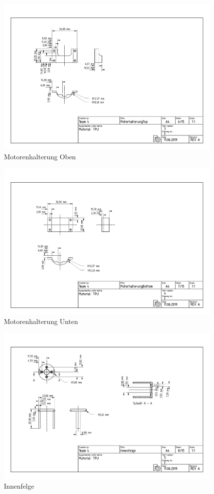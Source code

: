 \begin{figure}[ht!]
	\includegraphics[width=\textwidth]{../techzeich/3.PDF} 	
	\caption{Motorenhalterung Oben}
\end{figure}
\begin{figure}[ht!]
	\includegraphics[width=\textwidth]{../techzeich/4.PDF} 	
	\caption{Motorenhalterung Unten}
\end{figure}
\begin{figure}[ht!]
	\includegraphics[width=\textwidth]{../techzeich/5.PDF} 	
	\caption{Innenfelge}
\end{figure}
